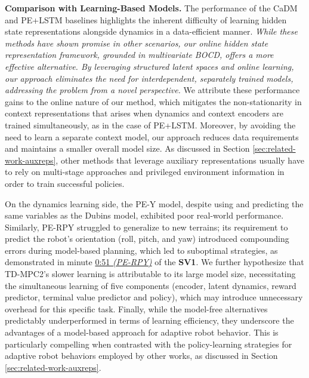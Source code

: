 \documentclass[Afour,sageh,times]{sagej}
\theoremstyle{lemma}
\begin{document}
\textbf{Comparison with Learning-Based Models.}
The performance of the CaDM and PE+LSTM baselines highlights the inherent difficulty of learning hidden state representations alongside dynamics in a data-efficient manner. \textit{While these methods have shown promise in other scenarios, our online hidden state representation framework, grounded in multivariate BOCD, offers a more effective alternative. By leveraging structured latent spaces and online learning, our approach eliminates the need for interdependent, separately trained models, addressing the problem from a novel perspective.} We attribute these performance gains to the online nature of our method, which mitigates the non-stationarity in context representations that arises when dynamics and context encoders are trained simultaneously, as in the case of PE+LSTM. Moreover, by avoiding the need to learn a separate context model, our approach reduces data requirements and maintains a smaller overall model size. As discussed in Section \ref{sec:related-work-auxreps}, other methods that leverage auxiliary representations usually have to rely on multi-stage approaches and privileged environment information in order to train successful policies.

On the dynamics learning side, the PE-Y model, despite using and predicting the same variables as the Dubins model, exhibited poor real-world performance. Similarly, PE-RPY struggled to generalize to new terrains; its requirement to predict the robot's orientation (roll, pitch, and yaw) introduced compounding errors during model-based planning, which led to suboptimal strategies, as demonstrated in minute \href{https://youtu.be/7a-NzAackE4?t=51}{0:51 \textit{(PE-RPY)}} of the \textbf{SV1}. We further hypothesize that TD-MPC2's slower learning is attributable to its large model size, necessitating the simultaneous learning of five components (encoder, latent dynamics, reward predictor, terminal value predictor and policy), which may introduce unnecessary overhead for this specific task. Finally, while the model-free alternatives predictably underperformed in terms of learning efficiency, they underscore the advantages of a model-based approach for adaptive robot behavior. This is particularly compelling when contrasted with the policy-learning strategies for adaptive robot behaviors employed by other works, as discussed in Section \ref{sec:related-work-auxreps}.
\end{document}
